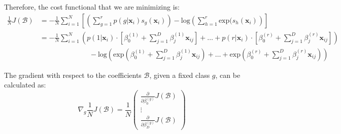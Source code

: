 \documentclass{article}
\begin{document}
Therefore, the cost functional that we are minimizing is:
\begin{equation*}
    \begin{split}
        \frac{1}{N} J(\mathcal{B}) & = - \frac{1}{N} \sum_{i = 1}^{N} \left [ \left ( \sum_{g = 1}^{r} p(g | \boldsymbol x_{i}) s_{g}(\boldsymbol x_{i}) \right ) - \text{log} {\left ( \sum_{h = 1}^{r} \text{exp}(s_{h}(\boldsymbol x_{i}) \right )} \right ] \\
        & = - \frac{1}{N} \sum_{i = 1}^{N} \left ( p(1 | \boldsymbol x_{i}) \cdot \left [ \beta_{0}^{(1)} + \sum_{j = 1}^{D} \beta_{j}^{(1)} \boldsymbol x_{ij} \right ] + \ldots + p(r | \boldsymbol x_{i}) \cdot \left [ \beta_{0}^{(r)} + \sum_{j = 1}^{D} \beta_{j}^{(r)} \boldsymbol x_{ij} \right ] \right ) \\
        & \quad \quad \quad \quad \quad \quad \quad - \text{log} {\left ( \text{exp}\left ( \beta_{0}^{(1)} + \sum_{j = 1}^{D} \beta_{j}^{(1)} \boldsymbol x_{ij} \right ) + \ldots + \text{exp}\left ( \beta_{0}^{(r)} + \sum_{j = 1}^{D} \beta_{j}^{(r)} \boldsymbol x_{ij} \right ) \right )}
    \end{split}
\end{equation*}

The gradient with respect to the coefficients $\mathcal{B}$, given a fixed class $g$, can be calculated as:
\begin{equation*}
    \nabla_{g} \frac{1}{N} J(\mathcal{B}) = \frac{1}{N} \begin{pmatrix}\frac{\partial}{\partial \beta_{0}^{(g)}} J(\mathcal{B}) \\ \vdots \\ \frac{\partial}{\partial \beta_{D}^{(g)}} J(\mathcal{B}) \end{pmatrix}
\end{equation*}
\end{document}
